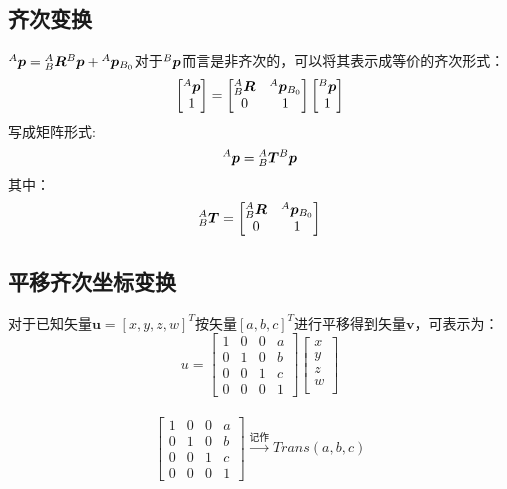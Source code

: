 \subsection{齐次变换}
$\zsb{p}{A}=\zb{R}{A}{B}\zsb{p}{B}+\djb{p}{A}{B_0}$对于$\zsb{p}{B}$而言是非齐次的，可以将其表示成等价的齐次形式：
\begin{equation}
\begin{bmatrix}
\zsb{p}{A}\\
1
\end{bmatrix}
=
\begin{bmatrix}
\zb{R}{A}{B} & \djb{p}{A}{B_0}\\
0 & 1
\end{bmatrix}
\begin{bmatrix}
\zsb{p}{B}\\
1
\end{bmatrix}
\end{equation}
写成矩阵形式:
\begin{equation}
\zsb{p}{A}=\zb{T}{A}{B}\zsb{p}{B}
\end{equation}
其中：
\begin{equation}
\zb{T}{A}{B}=
\begin{bmatrix}
\zb{R}{A}{B} & \djb{p}{A}{B_0}\\
0 & 1
\end{bmatrix}
\end{equation}
\subsection{平移齐次坐标变换}
对于已知矢量$\mathbf{u}=[x, y, z, w]^T$按矢量$[a, b, c]^T$进行平移得到矢量$\mathbf{v}$，可表示为：
\begin{equation}
u=
\begin{bmatrix}
1 & 0 & 0 & a\\
0 & 1 & 0 & b\\
0 & 0 & 1 & c\\
0 & 0 & 0 & 1
\end{bmatrix}
\begin{bmatrix}
x\\
y\\
z\\
w\\
\end{bmatrix}
\end{equation}
\\
\begin{equation}
\begin{bmatrix}
1 & 0 & 0 & a\\
0 & 1 & 0 & b\\
0 & 0 & 1 & c\\
0 & 0 & 0 & 1
\end{bmatrix}
\xrightarrow{记作}Trans(a, b, c)
\end{equation}
